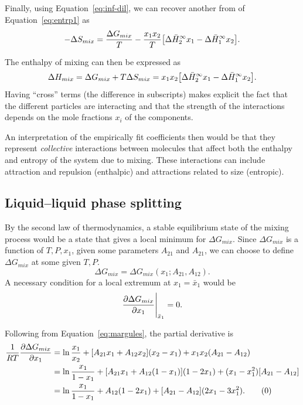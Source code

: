Finally, using Equation~\ref{eq:inf-dil}, we can recover another from of 
Equation~\ref{eq:entrp1} as
\begin{equation}\label{eq:entrp2}
    -\Delta S_{mix} = \dfrac{\Delta G_{mix}}{T} - \dfrac{x_1x_2}{T} \qty[
    \Delta \bar H_2^\infty x_1 - \Delta \bar H_1^\infty x_2].
\end{equation}

The enthalpy of mixing can then be expressed as
\begin{equation}\label{eq:enthalp}
    \Delta H_{mix} = \Delta G_{mix} + T\Delta S_{mix} = x_1x_2 \qty[
    \Delta \bar H_2^\infty x_1 - \Delta \bar H_1^\infty x_2].
\end{equation}
Having ``cross'' terms (the difference in subscripts) makes explicit the fact
that the different particles are interacting and that the strength of the
interactions depends on the mole fractions $x_i$ of the components.

An interpretation of the empirically fit coefficients then would be that they
represent \textit{collective} interactions between molecules that affect both
the enthalpy and entropy of the system due to mixing. These interactions can
include attraction and repulsion (enthalpic) and attractions related to size
(entropic).

\subsection{Liquid--liquid phase splitting}

By the second law of thermodynamics, a stable equilibrium state of the mixing
process would be a state that gives a local minimum for $\Delta G_{mix}$. Since
$\Delta G_{mix}$ is a function of $T, P, x_1$, given some parameters $A_{21}$
and $A_{21}$, we can choose to define $\Delta G_{mix}$ at some given $T,P$.
\[
    \Delta G_{mix} = \Delta G_{mix}(x_1; A_{21}, A_{12}).
\]
A necessary condition for a local extremum at $x_1 = \bar x_1$ would be
\[
    \pdv{\Delta G_{mix}}{x_1}\Bigg\rvert_{\bar x_1} = 0.
\]

Following from Equation~\ref{eq:margules}, the partial derivative is
\begin{align*}\label{eq:gderv}
    \dfrac{1}{RT} \pdv{\Delta G_{mix}}{x_1} &= \ln \dfrac{x_1}{x_2} + 
    [A_{21}x_1 + A_{12}x_2](x_2 - x_1) + x_1x_2(A_{21} - A_{12}) \\
    &= \ln\dfrac{x_1}{1-x_1} + [A_{21}x_1 + A_{12}(1-x_1)](1-2x_1) +
    (x_1 - x_1^2)[A_{21} - A_{12}] \\
    &= \ln\dfrac{x_1}{1-x_1} + A_{12}(1-2x_1) 
    + [A_{21} - A_{12}](2x_1 - 3x_1^2). \tag{\theequation}
\end{align*}

